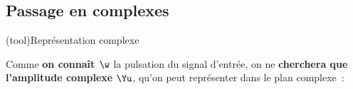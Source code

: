 \documentclass[../../main/main.tex]{subfiles}
\begin{document}

\subsection{Passage en complexes}
\begin{tcb*}[sidebyside, righthand ratio=.4](tool){Représentation complexe}

	Comme \textbf{on connaît $\w$} la pulsation du signal d'entrée, on ne
	\textbf{cherchera que l'amplitude complexe} $\Yu$, qu'on peut représenter
	dans le plan complexe~:
	\tcblower
	\begin{center}
\end{center}
\end{tcb*}
\end{document}
